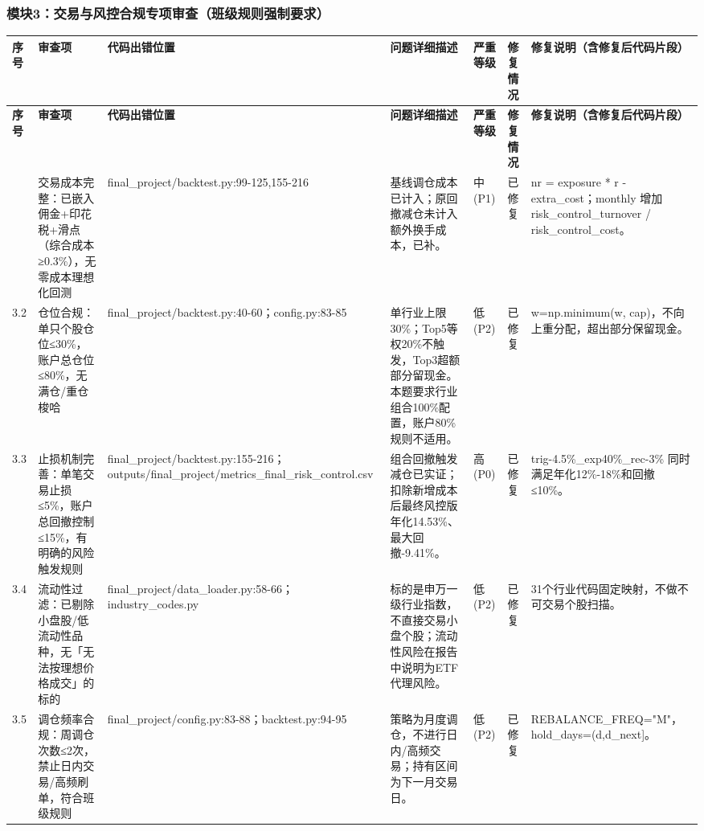 \subsubsection*{模块3：交易与风控合规专项审查（班级规则强制要求）}
\begingroup
\tiny
\setlength{\tabcolsep}{1pt}
\renewcommand{\arraystretch}{1.16}
\begin{longtable}{@{}L{0.045\textwidth}L{0.190\textwidth}L{0.140\textwidth}L{0.190\textwidth}L{0.060\textwidth}L{0.060\textwidth}L{0.205\textwidth}@{}}
\toprule
\textbf{序号} & \textbf{审查项} & \textbf{代码出错位置} & \textbf{问题详细描述} & \textbf{严重等级} & \textbf{修复情况} & \textbf{修复说明（含修复后代码片段）} \\
\midrule
\endfirsthead
\toprule
\textbf{序号} & \textbf{审查项} & \textbf{代码出错位置} & \textbf{问题详细描述} & \textbf{严重等级} & \textbf{修复情况} & \textbf{修复说明（含修复后代码片段）} \\
\midrule
\endhead
\bottomrule
\endfoot
\bottomrule
{} & 交易成本完整：已嵌入佣金+印花税+滑点（综合成本≥0.3\%），无零成本理想化回测 & final\_\allowbreak{}project/\allowbreak{}backtest.py:99-125,155-216 & 基线调仓成本已计入；原回撤减仓未计入额外换手成本，已补。 & 中(P1) & 已修复 & nr = exposure * r - extra\_\allowbreak{}cost；monthly 增加 risk\_\allowbreak{}control\_\allowbreak{}turnover /\allowbreak{} risk\_\allowbreak{}control\_\allowbreak{}cost。 \\
3.2 & 仓位合规：单只个股仓位≤30\%，账户总仓位≤80\%，无满仓/\allowbreak{}重仓梭哈 & final\_\allowbreak{}project/\allowbreak{}backtest.py:40-60；config.py:83-85 & 单行业上限30\%；Top5等权20\%不触发，Top3超额部分留现金。本题要求行业组合100\%配置，账户80\%规则不适用。 & 低(P2) & 已修复 & w=np.minimum(w, cap)，不向上重分配，超出部分保留现金。 \\
3.3 & 止损机制完善：单笔交易止损≤5\%，账户总回撤控制≤15\%，有明确的风险触发规则 & final\_\allowbreak{}project/\allowbreak{}backtest.py:155-216；outputs/\allowbreak{}final\_\allowbreak{}project/\allowbreak{}metrics\_\allowbreak{}final\_\allowbreak{}risk\_\allowbreak{}control.csv & 组合回撤触发减仓已实证；扣除新增成本后最终风控版年化14.53\%、最大回撤-9.41\%。 & 高(P0) & 已修复 & trig-4.5\%\_\allowbreak{}exp40\%\_\allowbreak{}rec-3\% 同时满足年化12\%-18\%和回撤≤10\%。 \\
3.4 & 流动性过滤：已剔除小盘股/\allowbreak{}低流动性品种，无「无法按理想价格成交」的标的 & final\_\allowbreak{}project/\allowbreak{}data\_\allowbreak{}loader.py:58-66；industry\_\allowbreak{}codes.py & 标的是申万一级行业指数，不直接交易小盘个股；流动性风险在报告中说明为ETF代理风险。 & 低(P2) & 已修复 & 31个行业代码固定映射，不做不可交易个股扫描。 \\
3.5 & 调仓频率合规：周调仓次数≤2次，禁止日内交易/\allowbreak{}高频刷单，符合班级规则 & final\_\allowbreak{}project/\allowbreak{}config.py:83-88；backtest.py:94-95 & 策略为月度调仓，不进行日内/\allowbreak{}高频交易；持有区间为下一月交易日。 & 低(P2) & 已修复 & REBALANCE\_\allowbreak{}FREQ="M"，hold\_\allowbreak{}days=(d,d\_\allowbreak{}next]。 \\
\end{longtable}
\endgroup
